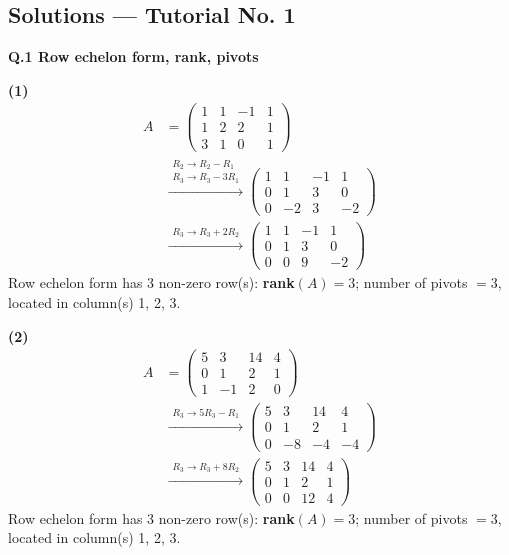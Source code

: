 \subsection*{Solutions --- Tutorial No. 1}
\medskip\noindent\textbf{Q.1  Row echelon form, rank, pivots}\par\smallskip

\noindent\textbf{(1)}
\begin{align*}
A &= \begin{pmatrix}1 & 1 & -1 & 1 \\ 1 & 2 & 2 & 1 \\ 3 & 1 & 0 & 1\end{pmatrix} \\
&\xrightarrow{\substack{R_2\to R_2-R_1\\ R_3\to R_3-3R_1}} \begin{pmatrix}1 & 1 & -1 & 1 \\ 0 & 1 & 3 & 0 \\ 0 & -2 & 3 & -2\end{pmatrix} \\
&\xrightarrow{\substack{R_3\to R_3+2R_2}} \begin{pmatrix}1 & 1 & -1 & 1 \\ 0 & 1 & 3 & 0 \\ 0 & 0 & 9 & -2\end{pmatrix}
\end{align*}
Row echelon form has 3 non-zero row(s): \textbf{rank}$(A)=3$; number of pivots $=3$, located in column(s) 1, 2, 3.

\noindent\textbf{(2)}
\begin{align*}
A &= \begin{pmatrix}5 & 3 & 14 & 4 \\ 0 & 1 & 2 & 1 \\ 1 & -1 & 2 & 0\end{pmatrix} \\
&\xrightarrow{\substack{R_3\to 5R_3-R_1}} \begin{pmatrix}5 & 3 & 14 & 4 \\ 0 & 1 & 2 & 1 \\ 0 & -8 & -4 & -4\end{pmatrix} \\
&\xrightarrow{\substack{R_3\to R_3+8R_2}} \begin{pmatrix}5 & 3 & 14 & 4 \\ 0 & 1 & 2 & 1 \\ 0 & 0 & 12 & 4\end{pmatrix}
\end{align*}
Row echelon form has 3 non-zero row(s): \textbf{rank}$(A)=3$; number of pivots $=3$, located in column(s) 1, 2, 3.

